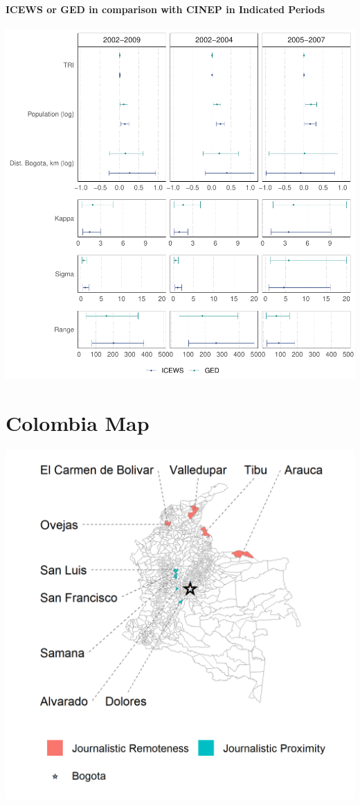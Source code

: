 \documentclass[
]{article}
\begin{document}
\hypertarget{icews-or-ged-in-comparison-with-cinep-in-indicated-periods}{%
\paragraph{ICEWS or GED in comparison with CINEP in Indicated Periods}\label{icews-or-ged-in-comparison-with-cinep-in-indicated-periods}}

\begin{center}\includegraphics[width=1\linewidth]{INLA_Model_Tables_files/figure-latex/unnamed-chunk-9-1} \end{center}

\pagebreak

\hypertarget{colombia-map}{%
\section{Colombia Map}\label{colombia-map}}

\begin{center}\includegraphics[width=1\linewidth]{Map} \end{center}
\end{document}
